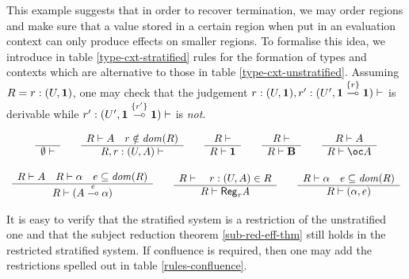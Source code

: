 \documentclass[11pt]{article}
\newcommand{\Gives}{\vdash}             \newcommand{\IGives}{\vdash_{I}}        \newcommand{\AIGives}{\vdash_{{\it AI}}} \newcommand{\CGives}{\vdash_{C}}
\newcommand{\limpe}[1]{\stackrel{#1}{\multimap}}
\newcommand{\hyp}[3]{#1:(#2, #3)}
\newcommand{\behtype}{{\bf B}}
\newcommand{\infer}[2]{\begin{array}{c} #1 \\ \hline #2 \end{array}}
\newcommand{\set}[1]{\{#1\}}
\newcommand{\rgtype}[2]{{\it {\sf Reg}_{#1} #2}}
\begin{document}
This example suggests that in order to recover termination,
we may order regions and make sure that
a value stored in a certain region when put in an
evaluation context can only produce effects on smaller regions.
To formalise this idea, we introduce
in table \ref{type-cxt-stratified} rules for the formation of
types and contexts which are alternative to those in
table  \ref{type-cxt-unstratified}.
Assuming $R= \hyp{r}{U}{\tertype}$,
one may check that the judgement
$\hyp{r}{U}{\tertype},\hyp{r'}{U'}{\tertype \limpe{\set{r}} \tertype}\Gives$  is derivable
while $\hyp{r'}{U'}{\tertype \limpe{\set{r'}}\tertype}\Gives$ is {\em not}.

\begin{table}
{\footnotesize
\[
\begin{array}{c}

\infer{}{\emptyset \Gives}

\qquad

\infer{R\Gives A\quad r\notin \w{dom}(R)}
{R,\hyp{r}{U}{A} \Gives} 

\qquad

\infer{R\Gives}
{R\Gives \tertype} 

\qquad

\infer{R\Gives}
{R\Gives \behtype} 

\qquad
\infer{R\Gives A}
{R\Gives \bang A}

\\ \\

\infer{
R\Gives A\quad R\Gives \alpha\quad e\subseteq \w{dom}(R)
}
{R\Gives (A\limpe{e} \alpha)} 

\qquad

\infer{R\Gives \quad \hyp{r}{U}{A} \in R}
{R\Gives \rgtype{r}{A}}  

\qquad

\infer{R\Gives \alpha\quad e\subseteq\w{dom}(R)}
{R\Gives (\alpha,e)} 

\end{array}
\]}
\caption{Rules for the formation of types and contexts (stratified)}\label{type-cxt-stratified}
\end{table}

It is easy to verify that the stratified system is a restriction of the
unstratified one and that the subject reduction theorem
\ref{sub-red-eff-thm} still holds in the restricted stratified
system. If confluence is required, then one may add 
the restrictions spelled out in table \ref{rules-confluence}.
\end{document}
